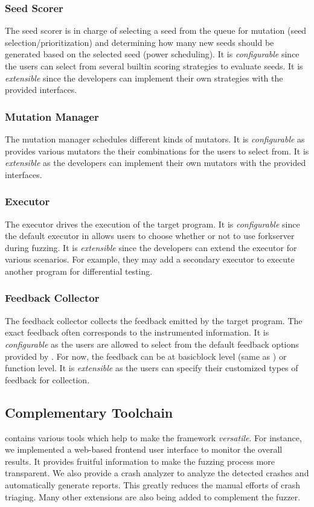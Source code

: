 \subsubsection{Seed Scorer}
The seed scorer is in charge of selecting a seed from the queue for mutation (seed selection/prioritization) and determining how many new seeds should be generated based on the selected seed (power scheduling).
It is \textit{configurable} since the users can select from several builtin scoring strategies to evaluate seeds.
It is \textit{extensible} since the developers can implement their own strategies with the provided interfaces.


\subsubsection{Mutation Manager}
The mutation manager schedules different kinds of mutators.
It is \textit{configurable} as {\FOT} provides various mutators the their combinations for the users to select from.
It is \textit{extensible} as the developers can implement their own mutators with the provided interfaces.

\subsubsection{Executor}
The executor drives the execution of the target program.
It is \textit{configurable} since the default executor in {\FOT} allows users to choose whether or not to use forkserver~\cite{afl} during fuzzing.
It is \textit{extensible} since the developers can extend the executor for various scenarios.
For example, they may add a secondary executor to execute another program for differential testing.

\subsubsection{Feedback Collector}
The feedback collector collects the feedback emitted by the target program.
The exact feedback often corresponds to the instrumented information.
It is \textit{configurable} as the users are allowed to select from the default feedback options provided by {\FOT}.
For now, the feedback can be at basicblock level (same as {\AFL}) or function level.
It is \textit{extensible} as the users can specify their customized types of feedback for collection.

\subsection{Complementary Toolchain}
{\FOT} contains various tools which help to make the framework \textit{versatile}.
For instance, we implemented a web-based frontend user interface to monitor the overall results.
It provides fruitful information to make the fuzzing process more transparent.
We also provide a crash analyzer to analyze the detected crashes and automatically generate reports.
This greatly reduces the manual efforts of crash triaging.
Many other extensions are also being added to complement the fuzzer.



